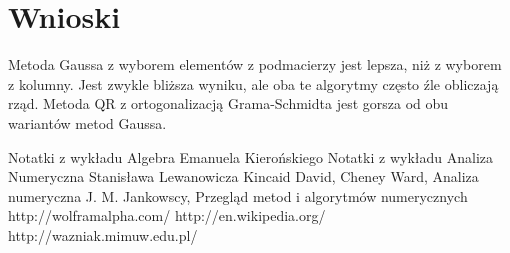 \documentclass[a4paper,10pt]{article}
\begin{document}
\section{Wnioski}
	Metoda Gaussa z wyborem elementów z podmacierzy jest lepsza, niż z wyborem z kolumny. Jest zwykle bliższa wyniku, ale oba te algorytmy często źle obliczają rząd.
	Metoda QR z ortogonalizacją Grama-Schmidta jest gorsza od obu wariantów metod Gaussa.
\begin{thebibliography}{9}
	 Notatki z wykładu Algebra Emanuela Kierońskiego
	 Notatki z wykładu Analiza Numeryczna Stanisława Lewanowicza
	 Kincaid David, Cheney Ward, Analiza numeryczna
	 J. M. Jankowscy, Przegląd metod i algorytmów numerycznych
	 http://wolframalpha.com/
	 http://en.wikipedia.org/
	 http://wazniak.mimuw.edu.pl/
\end{thebibliography}
\end{document}
